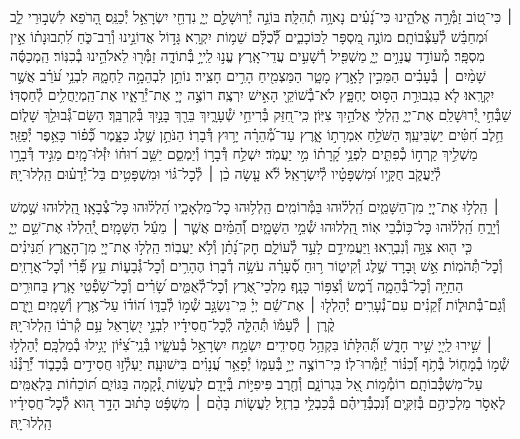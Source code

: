 \documentclass[twoside, openany, parskip=half, 11pt]{book}
\begin{document}
 ׀
כִּי־ט֭וֹב זַמְּ֯רָ֣ה אֱלֹהֵ֑ינוּ כִּי־נָ֝עִ֗ים נָאוָ֥ה תְ֯הִלָּֽה׃
בּוֹנֵ֣ה יְ֯רֽוּשָׁלַ֣‍ִם יְיָ֑ נִדְחֵ֖י יִשְׂרָאֵ֣ל יְ֯כַנֵּֽס׃
הָ֭רֹפֵא לִשְׁב֣וּרֵי לֵ֑ב וּ֝מְחַבֵּ֗שׁ לְ֯עַצְּ֯בוֹתָֽם׃
מוֹנֶ֣ה מִ֭סְפָּר לַכּוֹכָבִ֑ים לְ֯֝כֻלָּ֗ם שֵׁמ֥וֹת יִקְרָֽא׃
גָּד֣וֹל אֲדוֹנֵ֣ינוּ וְ֯רַב־כֹּ֑חַ לִ֝תְבוּנָת֗וֹ אֵ֣ין מִסְפָּֽר׃
מְ֯עוֹדֵ֣ד עֲנָוִ֣ים יְיָ֑ מַשְׁפִּ֖יל רְ֯שָׁעִ֣ים עֲדֵי־אָֽרֶץ׃
עֱנ֣וּ לַֽייָ֣ בְּ֯תוֹדָ֑ה זַמְּ֯ר֖וּ לֵאלֹהֵ֣ינוּ בְ֯כִנּֽוֹר׃
הַֽמְכַסֶּ֬ה שָׁמַ֨יִם ׀ בְּ֯עָבִ֗ים הַמֵּכִ֣ין לָאָ֣רֶץ מָטָ֑ר הַמַּצְמִ֖יחַ הָרִ֣ים חָצִֽיר׃
נוֹתֵ֣ן לִבְהֵמָ֣ה לַחְמָ֑הּ לִבְנֵ֥י עֹ֝רֵ֗ב אֲשֶׁ֣ר יִקְרָֽאוּ׃
לֹ֤א בִגְבוּרַ֣ת הַסּ֣וּס יֶחְפָּ֑ץ לֹא־בְ֯שׁוֹקֵ֖י הָאִ֣ישׁ יִרְצֶֽה׃
רוֹצֶ֣ה יְיָ֭ אֶת־יְ֯רֵאָ֑יו אֶת־הַֽמְיַחֲלִ֥ים לְ֯חַסְדּֽוֹ׃
שַׁבְּ֯חִ֣י יְ֭֯רוּשָׁלַ‍ִם אֶת־יְיָ֑ הַֽלְלִ֖י אֱלֹהַ֣יִךְ צִיּֽוֹן׃
כִּֽי־חִ֭זַּק בְּ֯רִיחֵ֣י שְׁ֯עָרָ֑יִךְ בֵּרַ֖ךְ בָּנַ֣יִךְ בְּ֯קִרְבֵּֽךְ׃
הַשָּׂם־גְּ֯בוּלֵ֥ךְ שָׁל֑וֹם חֵ֥לֶב חִ֝טִּ֗ים יַשְׂבִּיעֵֽךְ׃
הַשֹּׁלֵ֣חַ אִמְרָת֣וֹ אָ֑רֶץ עַד־מְ֯֝הֵרָ֗ה יָר֥וּץ דְּ֯בָרֽוֹ׃
הַנֹּתֵ֣ן שֶׁ֣לֶג כַּצָּ֑מֶר כְּ֯֝פ֗וֹר כָּאֵ֥פֶר יְ֯פַזֵּֽר׃
מַשְׁלִ֣יךְ קַֽרְח֣וֹ כְ֯פִתִּ֑ים לִפְנֵ֥י קָ֝רָת֗וֹ מִ֣י יַעֲמֹֽד׃
יִשְׁלַ֣ח דְּ֯בָר֣וֹ וְ֯יַמְסֵ֑ם יַשֵּׁ֥ב ר֝וּח֗וֹ יִזְּ֯לוּ־מָֽיִם׃
מַגִּ֣יד דְּ֯בָרָ֣ו לְ֯יַעֲקֹ֑ב חֻקָּ֥יו וּ֝מִשְׁפָּטָ֗יו לְ֯יִשְׂרָאֵֽל׃
לֹ֘א עָ֤שָׂה כֵ֨ן ׀ לְ֯כׇל־גּ֗וֹי וּמִשְׁפָּטִ֥ים בַּל־יְ֯דָע֗וּם הַֽלְלוּ־יָֽהּ׃


 ׀
הַֽלְל֣וּ אֶת־יְיָ֭ מִן־הַשָּׁמַ֑יִם הַֽ֝לְל֗וּהוּ בַּמְּ֯רוֹמִֽים׃
הַֽלְל֥וּהוּ כׇל־מַלְאָכָ֑יו הַ֝לְל֗וּהוּ כׇּל־צְ֯בָאָֽו׃
הַֽ֭לְלוּהוּ שֶׁ֣מֶשׁ וְ֯יָרֵ֑חַ הַֽ֝לְל֗וּהוּ כׇּל־כּ֥וֹכְ֯בֵי אֽוֹר׃
הַֽ֭לְלוּהוּ שְׁ֯מֵ֣י הַשָּׁמָ֑יִם וְ֯֝הַמַּ֗יִם אֲשֶׁ֤ר ׀ מֵעַ֬ל הַשָּׁמָֽיִם׃
יְֽ֭֯הַלְלוּ אֶת־שֵׁ֣ם יְיָ֑ כִּ֤י ה֖וּא צִוָּ֣ה וְ֯נִבְרָֽאוּ׃
וַיַּעֲמִידֵ֣ם לָעַ֣ד לְ֯עוֹלָ֑ם חׇק־נָ֝תַ֗ן וְ֯לֹ֣א יַעֲבֽוֹר׃
הַֽלְל֣וּ אֶת־יְיָ֭ מִן־הָאָ֑רֶץ תַּ֝נִּינִ֗ים וְ֯כׇל־תְּ֯הֹמֽוֹת׃
אֵ֣שׁ וּ֭בָרָד שֶׁ֣לֶג וְ֯קִיט֑וֹר ר֥וּחַ סְ֯֝עָרָ֗ה עֹשָׂ֥ה דְ֯בָרֽוֹ׃
הֶהָרִ֥ים וְ֯כׇל־גְּ֯בָע֑וֹת עֵ֥ץ פְּ֯֝רִ֗י וְ֯כׇל־אֲרָזִֽים׃
הַחַיָּ֥ה וְ֯כׇל־בְּ֯הֵמָ֑ה רֶ֗֝מֶשׂ וְ֯צִפּ֥וֹר כָּנָֽף׃
מַלְכֵי־אֶ֭רֶץ וְ֯כׇל־לְ֯אֻמִּ֑ים שָׂ֝רִ֗ים וְ֯כׇל־שֹׁ֥פְ֯טֵי אָֽרֶץ׃
בַּחוּרִ֥ים וְ֯גַם־בְּ֯תוּל֑וֹת זְ֯֝קֵנִ֗ים עִם־נְ֯עָרִֽים׃
יְ֯הַלְל֤וּ ׀ אֶת־שֵׁ֬ם יְיָ֗ כִּֽי־נִשְׂגָּ֣ב שְׁ֯מ֣וֹ לְ֯בַדּ֑וֹ
ה֝וֹד֗וֹ עַל־אֶ֥רֶץ וְ֯שָׁמָֽיִם׃ וַיָּ֤רֶם קֶ֨רֶן ׀ לְ֯עַמּ֡וֹ תְּ֯הִלָּ֤ה לְֽ֯כׇל־חֲסִידָ֗יו
לִבְנֵ֣י יִ֭שְׂרָאֵל עַ֥ם קְ֯רֹב֗וֹ הַֽלְלוּ־יָֽהּ׃\\
 ׀
שִׁ֣ירוּ לַֽייָ֭ שִׁ֣יר חָדָ֑שׁ תְּ֯֝הִלָּת֗וֹ בִּקְהַ֥ל חֲסִידִֽים׃
יִשְׂמַ֣ח יִשְׂרָאֵ֣ל בְּ֯עֹשָׂ֑יו בְּ֯נֵֽי־צִ֝יּ֗וֹן יָגִ֥ילוּ בְ֯מַלְכָּֽם׃
יְ֯הַלְל֣וּ שְׁ֯מ֣וֹ בְ֯מָח֑וֹל בְּ֯תֹ֥ף וְ֯֝כִנּ֗וֹר יְ֯זַמְּ֯רוּ־לֽוֹ׃
כִּֽי־רוֹצֶ֣ה יְיָ֣ בְּ֯עַמּ֑וֹ יְ֯פָאֵ֥ר עֲ֝נָוִ֗ים בִּישׁוּעָֽה׃
יַעְלְ֯ז֣וּ חֲסִידִ֣ים בְּ֯כָב֑וֹד יְ֯֝רַנְּ֯נ֗וּ עַל־מִשְׁכְּ֯בוֹתָֽם׃
רוֹמְ֯מ֣וֹת אֵ֭ל בִּגְרוֹנָ֑ם וְ֯חֶ֖רֶב פִּיפִיּ֣וֹת בְּ֯יָדָֽם׃
לַעֲשׂ֣וֹת נְ֭֯קָמָה בַּגּוֹיִ֑ם תּ֝וֹכֵח֗וֹת בַּלְאֻמִּֽים׃
לֶאְסֹ֣ר מַלְכֵיהֶ֣ם בְּ֯זִקִּ֑ים וְ֯֝נִכְבְּ֯דֵיהֶ֗ם בְּ֯כַבְלֵ֥י בַרְזֶֽל׃
לַעֲשׂ֤וֹת בָּהֶ֨ם ׀ מִשְׁפָּ֬ט כָּת֗וּב הָדָ֣ר ה֭וּא לְ֯כׇל־חֲסִידָ֗יו הַֽלְלוּ־יָֽהּ׃
\end{document}
